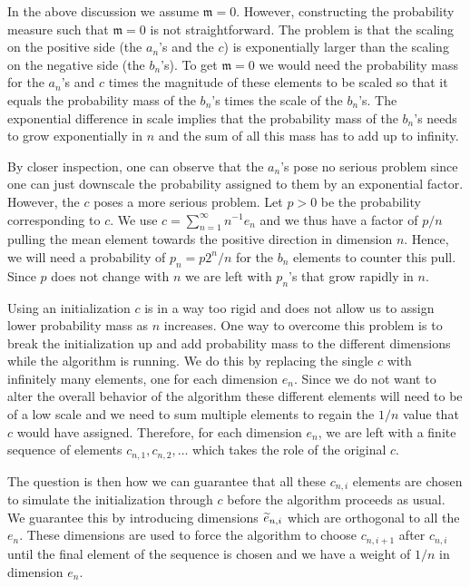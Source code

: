 \documentclass[AHL,Unicode,longabstracts,published]{cedram}
\theoremstyle{remark}
\newcommand{\mean}{\mathfrak{m}}
\let\oldtilde\tilde
\renewcommand*{\tilde}[1]{\mathchoice{\widetilde{#1}}{\widetilde{#1}}{\oldtilde{#1}}{\oldtilde{#1}}}
\begin{document}
In the above discussion we assume $\mean = 0$. However, constructing the probability measure such that $\mean = 0$ is not straightforward. The problem is that the scaling on the positive side (the $a_n$'s and the $c$) is exponentially larger than the scaling on the negative side (the $b_n$'s). To get $\mean = 0$ we would need the probability mass for the $a_n$'s and $c$ times the magnitude of these elements to be scaled so that it equals the probability mass of the $b_n$'s times the scale of the $b_n$'s. The exponential difference in scale implies that the probability mass of the $b_n$'s needs to grow exponentially in $n$ and the sum of all this mass has to add up to infinity.

By closer inspection, one can observe that the $a_n$'s pose no serious problem since one can just downscale the probability assigned to them by an exponential factor. However, the $c$ poses a more serious problem. Let $p > 0$ be the probability corresponding to $c$. We use $c= \sum_{n=1}^\infty n^{-1} e_n$ and we thus have a factor of $p/n$ pulling the mean element towards the positive direction in dimension $n$. Hence, we will need a probability of $p_n = p 2^n/n$ for the $b_n$ elements to counter this pull. Since $p$ does not change with $n$ we are left with $p_n$'s that grow rapidly in $n$.

Using an initialization $c$ is in a way too rigid and does not allow us to assign lower probability mass as $n$ increases. One way to overcome this problem is to break the initialization up and add probability mass to the different dimensions while the algorithm is running. We do this by replacing the single $c$ with infinitely many elements, one for each dimension $e_n$. Since we do not want to alter the overall behavior of the algorithm these different elements will need to be of a low scale and we need to sum multiple elements to regain the $1/n$ value that $c$ would have assigned. Therefore, for each dimension $e_n$, we are left with a finite sequence of elements $c_{n,1}, c_{n,2},\dots$ which takes the role of the original $c$.

The question is then how we can guarantee that all these $c_{n,i}$ elements are chosen to simulate the initialization through $c$ before the algorithm proceeds as usual. We guarantee this by introducing dimensions $\tilde e_{n,i}$ which are orthogonal to all the $e_n$. These dimensions are used to force the algorithm to choose $c_{n,i+1}$ after $c_{n,i}$ until the final element of the sequence is chosen and we have a weight of $1/n$ in dimension $e_n$.
\end{document}
